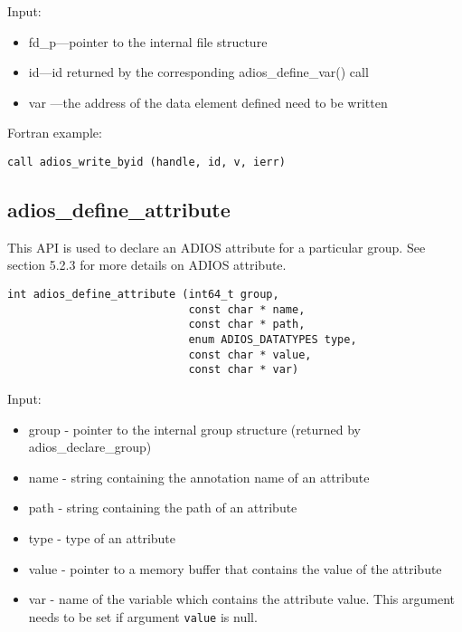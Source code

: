 Input:
\begin{itemize}
\item fd\_p---pointer to the internal file structure
\item id---id returned by the corresponding adios\_define\_var() call
\item var ---the address of the data element defined need to be written
\end{itemize}

Fortran example: 
\begin{lstlisting}[alsolanguage=Fortran,caption={},label={}]
call adios_write_byid (handle, id, v, ierr)
\end{lstlisting}


\subsection{adios\_define\_attribute}

This API is used to declare an ADIOS attribute for a particular group. See section 
5.2.3 for more details on ADIOS attribute.

\begin{lstlisting}[alsolanguage=C,caption={},label={}]
int adios_define_attribute (int64_t group,
                            const char * name, 
                            const char * path,
                            enum ADIOS_DATATYPES type,
                            const char * value,
                            const char * var)
\end{lstlisting}

Input:
\begin{itemize}
\item group - pointer to the internal group structure (returned by adios\_declare\_group)

\item name - string containing the annotation name of an attribute

\item path - string containing the path of an attribute

\item type  - type of an attribute

\item value - pointer to a memory buffer that contains the value of the attribute

\item var - name of the variable which contains the attribute value. This argument needs 
to be set if argument \verb+value+ is null.  
\end{itemize}

